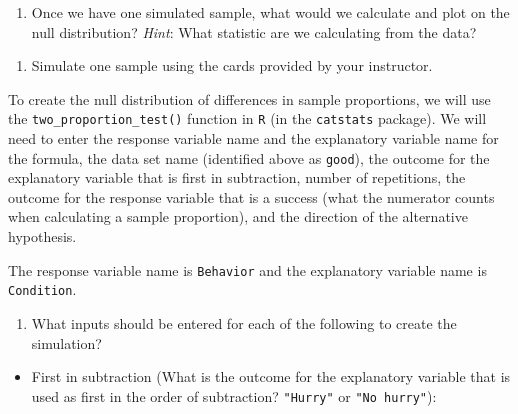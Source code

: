 \documentclass[
]{report}
\providecommand{\tightlist}{%
  \setlength{\itemsep}{0pt}\setlength{\parskip}{0pt}}
\begin{document}
\vspace{0.8in}

\begin{enumerate}
\def\labelenumi{\arabic{enumi}.}
\setcounter{enumi}{13}
\tightlist
\item
  Once we have one simulated sample, what would we calculate and plot on the null distribution? \emph{Hint}: What statistic are we calculating from the data?
\end{enumerate}

\vspace{0.8in}

\begin{enumerate}
\def\labelenumi{\arabic{enumi}.}
\setcounter{enumi}{14}
\tightlist
\item
  Simulate one sample using the cards provided by your instructor.
\end{enumerate}

\vspace{1in}

To create the null distribution of differences in sample proportions, we will use the \texttt{two\_proportion\_test()} function in \texttt{R} (in the \texttt{catstats} package). We will need to enter the response variable name and the explanatory variable name for the formula, the data set name (identified above as \texttt{good}), the outcome for the explanatory variable that is first in subtraction, number of repetitions, the outcome for the response variable that is a success (what the numerator counts when calculating a sample proportion), and the direction of the alternative hypothesis.

The response variable name is \texttt{Behavior} and the explanatory variable name is \texttt{Condition}.

\begin{enumerate}
\def\labelenumi{\arabic{enumi}.}
\setcounter{enumi}{15}
\tightlist
\item
  What inputs should be entered for each of the following to create the simulation?
\end{enumerate}

\vspace{.2in}

\begin{itemize}
\tightlist
\item
  First in subtraction (What is the outcome for the explanatory variable that is used as first in the order of subtraction? \texttt{"Hurry"} or \texttt{"No\ hurry"}):
\end{itemize}
\end{document}
